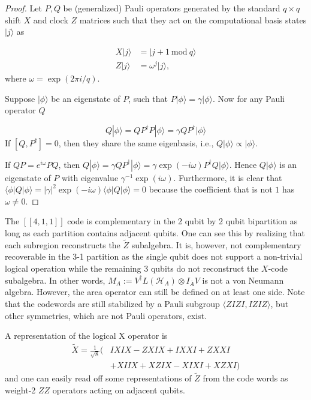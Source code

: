 \documentclass[%
 reprint,
superscriptaddress,
nofootinbib,
 amsmath,amssymb,
 aps,
prx,
floatfix,
]{revtex4-2}
\theoremstyle{definition}
\numberwithin{equation}{section}
\begin{document}
\begin{proof}
Let $P,Q$ be (generalized) Pauli operators generated by the standard $q\times q$ shift $X$ and clock $Z$ matrices such that they act on the computational basis states $|j\rangle$ as

\begin{align*}
    X|j\rangle &= |j+1~\mathrm{mod}~q\rangle\\
    Z|j\rangle &= \omega^j |j\rangle,
\end{align*}
where $\omega = \exp(2\pi i/q)$.

Suppose $|\phi\rangle$ be an eigenstate of $P$, such that $P|\phi\rangle = \gamma |\phi\rangle$. Now for any Pauli operator $Q$

\begin{equation}
    Q|\phi\rangle = QP^{\dagger} P|\phi\rangle =\gamma QP^{\dagger}|\phi\rangle  
\end{equation}
If $[Q,P^{\dagger}]=0$, then they share the same eigenbasis, i.e., $Q|\phi\rangle\propto|\phi\rangle$.

If $QP=e^{i\omega}PQ$, then $Q|\phi\rangle=\gamma QP^{\dagger}|\phi\rangle = \gamma \exp(-i\omega) P^{\dagger}Q|\phi\rangle$. Hence $Q|\phi\rangle$ is an eigenstate of $P$ with eigenvalue $\gamma^{-1}\exp(i\omega)$. Furthermore, it is clear that $\langle\phi|Q|\phi\rangle = |\gamma|^2 \exp(-i\omega)\langle\phi|Q|\phi\rangle =0$ because the coefficient that is not $1$ has $\omega\ne 0$. 
\end{proof}

The $[[4,1,1]]$ code is complementary in the 2 qubit by 2 qubit bipartition as long as each partition contains adjacent qubits. One can see this by realizing that each subregion reconstructs the $\tilde{Z}$ subalgebra. It is, however, not complementary recoverable in the 3-1 partition as the single qubit does not support a non-trivial logical operation while the remaining 3 qubits do not reconstruct the ${X}$-code subalgebra. In other words, $M_A:=V^{\dagger} L(\mathcal{H}_A)\otimes I_{\bar{A}} V$ is not a von Neumann algebra. However, the area operator can still be defined on at least one side. Note that the codewords are still stabilized by a Pauli subgroup $\langle ZIZI,IZIZ\rangle$, but other symmetries, which are not Pauli operators, exist.

A representation of the logical X operator is
\begin{align*}
    \tilde{X}=\frac{1}{\sqrt{8}}(&IXIX-ZXIX+IXXI+ZXXI\\
    &+XIIX+XZIX-XIXI+XZXI)
\end{align*}
and one can easily read off some representations of $\tilde{Z}$ from the code words as weight-2 $ZZ$ operators acting on adjacent qubits. 
\end{document}
